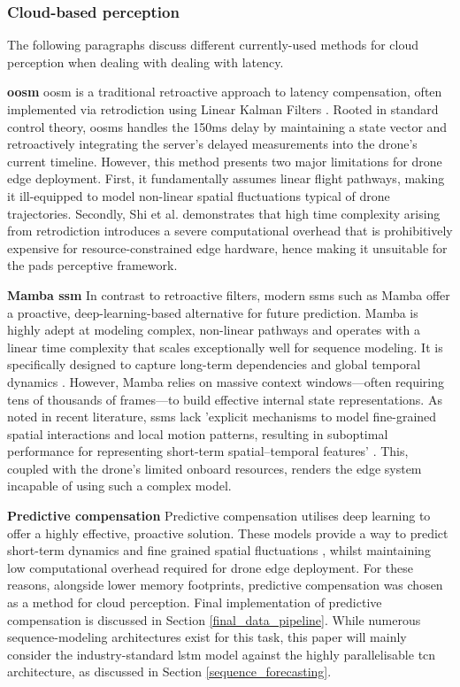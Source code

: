 \documentclass{report_template_oxford}
\begin{document}
\subsubsection{Cloud-based perception} \label{cloud based perception}
The following paragraphs discuss different currently-used methods for cloud perception when dealing with dealing with latency. 

\textbf{\gls{oosm}} \gls{oosm} is a traditional retroactive approach to latency compensation, often implemented via retrodiction using Linear Kalman Filters \cite{bar_shalom}. Rooted in standard control theory, \glspl{oosm} handles the 150ms delay by maintaining a state vector and retroactively integrating the server's delayed measurements into the drone's current timeline. However, this method presents two major limitations for drone edge deployment. First, it fundamentally assumes linear flight pathways, making it ill-equipped to model non-linear spatial fluctuations typical of drone trajectories. Secondly, Shi et al. \cite{shimodified2020} demonstrates that high time complexity arising from retrodiction introduces a severe computational overhead that is prohibitively expensive for resource-constrained edge hardware, hence making it unsuitable for the \gls{pads} perceptive framework.

\textbf{Mamba \gls{ssm}} In contrast to retroactive filters, modern \glspl{ssm} such as Mamba offer a proactive, deep-learning-based alternative for future prediction. Mamba is highly adept at modeling complex, non-linear pathways and operates with a linear time complexity that scales exceptionally well for sequence modeling. It is specifically designed to capture long-term dependencies and global temporal dynamics \cite{gu2024mambalineartimesequencemodeling}. However, Mamba relies on massive context windows—often requiring tens of thousands of frames—to build effective internal state representations. As noted in recent literature, \glspl{ssm} lack 'explicit mechanisms to model fine-grained spatial interactions and local motion patterns, resulting in suboptimal performance for representing short-term spatial–temporal features' \cite{ZHANG2025130464}. This, coupled with the drone's limited onboard resources, renders the edge system incapable of using such a complex model. 

\textbf{Predictive compensation} Predictive compensation utilises deep learning to offer a highly effective, proactive solution. These models provide a way to predict short-term dynamics and fine grained spatial fluctuations \cite{ZHANG2025130464}\cite{dong2023tcn}, whilst maintaining low computational overhead required for drone edge deployment. For these reasons, alongside lower memory footprints, predictive compensation was chosen as a method for cloud perception. Final implementation of predictive compensation is discussed in Section \ref{final_data_pipeline}. While numerous sequence-modeling architectures exist for this task, this paper will mainly consider the industry-standard \gls{lstm} model against the highly parallelisable \gls{tcn} architecture, as discussed in Section \ref{sequence_forecasting}. 
\end{document}
